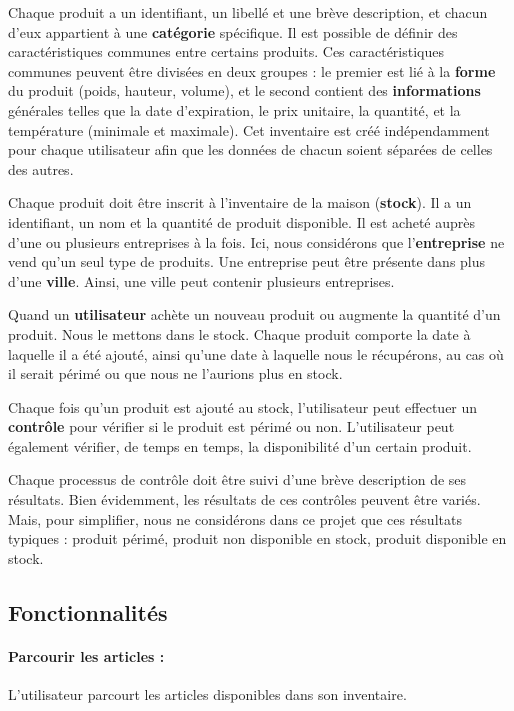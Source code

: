 Chaque produit a un identifiant, un libellé et une brève description, et chacun d'eux appartient à une \textbf{catégorie} spécifique. Il est possible de définir des caractéristiques communes entre certains produits. Ces caractéristiques communes peuvent être divisées en deux groupes : le premier est lié à la \textbf{forme} du produit (poids, hauteur, volume), et le second contient des \textbf{informations} générales telles que la date d'expiration, le prix unitaire, la quantité, et la température (minimale et maximale). Cet inventaire est créé indépendamment pour chaque utilisateur afin que les données de chacun soient séparées de celles des autres.

Chaque produit doit être inscrit à l'inventaire de la maison (\textbf{stock}). Il a un identifiant, un nom et la quantité de produit disponible. Il est acheté auprès d'une ou plusieurs entreprises à la fois. Ici, nous considérons que l'\textbf{entreprise} ne vend qu'un seul type de produits. Une entreprise peut être présente dans plus d'une \textbf{ville}. Ainsi, une ville peut contenir plusieurs entreprises.

Quand un \textbf{utilisateur} achète un nouveau produit ou augmente la quantité d'un produit. Nous le mettons dans le stock. Chaque produit comporte la date à laquelle il a été ajouté, ainsi qu'une date à laquelle nous le récupérons, au cas où il serait périmé ou que nous ne l'aurions plus en stock.

Chaque fois qu'un produit est ajouté au stock, l'utilisateur peut effectuer un \textbf{contrôle} pour vérifier si le produit est périmé ou non. L'utilisateur peut également vérifier, de temps en temps, la disponibilité d'un certain produit.

Chaque processus de contrôle doit être suivi d'une brève description de ses résultats. Bien évidemment, les résultats de ces contrôles peuvent être variés. Mais, pour simplifier, nous ne considérons dans ce projet que ces résultats typiques : produit périmé, produit non disponible en stock, produit disponible en stock.

\subsection{Fonctionnalités}

\paragraph{Parcourir les articles :} L'utilisateur parcourt les articles disponibles dans son inventaire.
